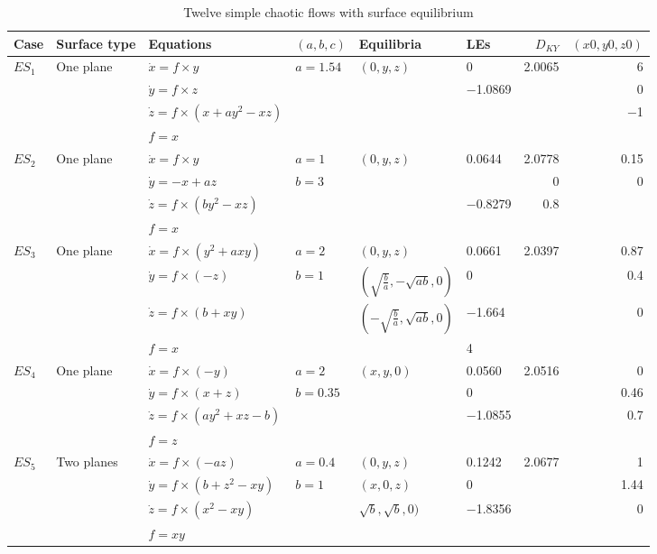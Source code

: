 \begin{table}[htbp]
  \centering
\caption{\label{tab:sur_tab1}Twelve simple chaotic flows with surface equilibrium}
\centering
\begin{tabular}{llllllrr}
\hline
\hline
Case & Surface type & Equations & \((a, b, c)\) & Equilibria & LEs & \(D_{KY}\) & \((x0, y0, z0)\)\\
\hline
\(ES_1\) & One plane & \(\dot{x} = f\times{}y\) & \(a = 1.54\) & \((0, y, z)\) & 0 & 2.0065 & 6\\
 &  & $\dot{y} =  f\times{}z$ &  &  & −1.0869 &  & 0\\
 &  & \(\dot{z} = f\times(x + ay^2 − xz)\) &  &  &  &  & −1\\
 &  & \(f = x\) &  &  &  &  & \\
\hline
\(ES_2\) & One plane & \(\dot{x} = f\times{}y\) & \(a = 1\) & \((0, y, z)\) & 0.0644 & 2.0778 & 0.15\\
 &  & \(\dot{y} = -x + az\) & \(b =3\) &  &  & 0 & 0\\
 &  & \(\dot{z} = f\times{}(by^2 − xz)\) &  &  & −0.8279 & 0.8 & \\
 &  & \(f = x\) &  &  &  &  & \\
\hline
\(ES_3\) & One plane & \(\dot{x} = f\times{}(y^2 + axy)\) & \(a = 2\) & \((0, y, z)\) & 0.0661 & 2.0397 & 0.87\\
 &  & \(\dot{y} = f\times{}(−z)\) & \(b = 1\) & \((\sqrt{\frac{b}{a}}, -\sqrt{ab}, 0)\) & 0 &  & 0.4\\
 &  & \(\dot{z} = f\times{}(b + xy)\) &  & \((-\sqrt{\frac{b}{a}}, \sqrt{ab},0)\) & −1.664 &  & 0\\
 &  & \(f=x\) &  &  & 4 &  & \\
\hline
\(ES_4\) & One plane & \(\dot{x} = f\times{}(−y)\) & \(a = 2\) & \((x, y, 0)\) & 0.0560 & 2.0516 & 0\\
 &  & \(\dot{y} = f\times(x + z)\) & \(b = 0.35\) &  & 0 &  & 0.46\\
 &  & \(\dot{z} = f\times(ay^2 + xz − b)\) &  &  & −1.0855 &  & 0.7\\
 &  & \(f = z\) &  &  &  &  & \\
\hline
\(ES_5\) & Two planes & \(\dot{x} = f\times(−az)\) & \(a = 0.4\) & \((0, y, z)\) & 0.1242 & 2.0677 & 1\\
 &  & \(\dot{y} = f\times(b + z^2 − xy)\) & \(b = 1\) & \((x, 0, z)\) & 0 &  & 1.44\\
 &  & \(\dot{z} = f\times(x^2 − xy)\) &  & \(\sqrt{b}, \sqrt{b}, 0)\) & −1.8356 &  & 0\\
 &  & \(f = xy\) &  &  &  &  & \\

\end{tabular}
\end{table}
